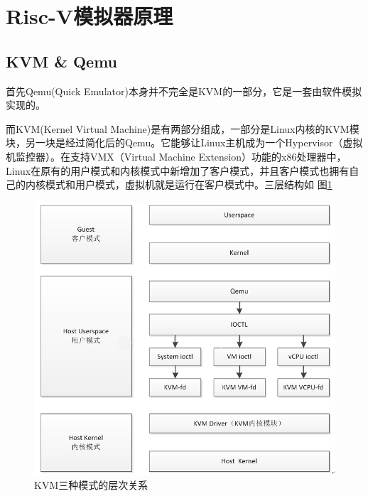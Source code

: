\section{Risc-V模拟器原理}
\subsection{KVM \& Qemu}
首先Qemu(Quick Emulator)本身并不完全是KVM的一部分，它是一套由软件模拟实现的。

而KVM(Kernel Virtual Machine)是有两部分组成，一部分是Linux内核的KVM模块，另一块是经过简化后的Qemu。它能够让Linux主机成为一个Hypervisor（虚拟机监控器）。在支持VMX（Virtual    Machine Extension）功能的x86处理器中，Linux在原有的用户模式和内核模式中新增加了客户模式，并且客户模式也拥有自己的内核模式和用户模式，虚拟机就是运行在客户模式中。三层结构如   图\ref{fig:kvm}

\begin{figure}[htbp]
  \centering %
  \includegraphics[width=0.6 \textwidth]{figs/KVM三种模式的层次关系.png}
  \caption{KVM三种模式的层次关系}
  \label{fig:kvm} %
\end{figure}
